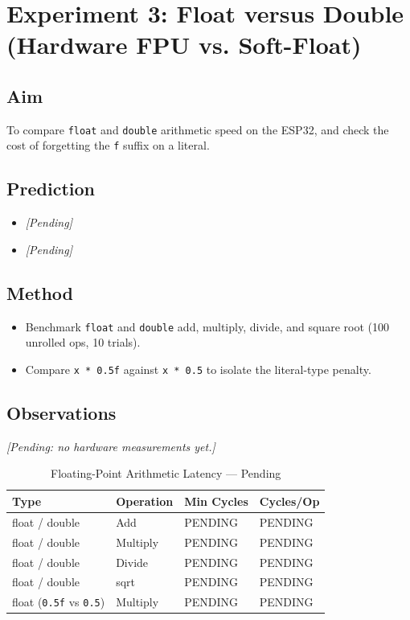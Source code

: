 \section{Experiment 3: Float versus Double (Hardware FPU vs. Soft-Float)}

\subsection{Aim}
To compare \texttt{float} and \texttt{double} arithmetic speed on the ESP32, and check the cost of forgetting the \texttt{f} suffix on a literal.

\subsection{Prediction}
\begin{itemize}[noitemsep]
    \item \textit{[Pending]}
    \item \textit{[Pending]}
\end{itemize}

\subsection{Method}
\begin{itemize}[noitemsep]
    \item Benchmark \texttt{float} and \texttt{double} add, multiply, divide, and square root (100 unrolled ops, 10 trials).
    \item Compare \texttt{x * 0.5f} against \texttt{x * 0.5} to isolate the literal-type penalty.
\end{itemize}

\subsection{Observations}
\textit{[Pending: no hardware measurements yet.]}

\begin{table}[htbp]
\centering
\caption{Floating-Point Arithmetic Latency --- Pending}
\label{tab:exp3_obs}
\small
\begin{tabularx}{\textwidth}{l l X X}
\toprule
\textbf{Type} & \textbf{Operation} & \textbf{Min Cycles} & \textbf{Cycles/Op} \\
\midrule
float / double & Add & PENDING & PENDING \\
float / double & Multiply & PENDING & PENDING \\
float / double & Divide & PENDING & PENDING \\
float / double & sqrt & PENDING & PENDING \\
float (\texttt{0.5f} vs \texttt{0.5}) & Multiply & PENDING & PENDING \\
\bottomrule
\end{tabularx}
\end{table}

